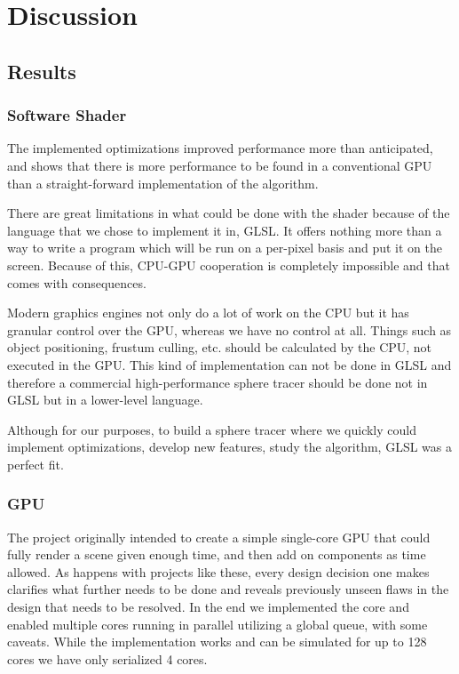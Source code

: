 \chapter{Discussion}
	
	\section{Results}
		
		\subsection{Software Shader}
		
			The implemented optimizations improved performance more than anticipated,
			and shows that there is more performance to be found in a conventional
			GPU than a straight-forward implementation of the algorithm. 

			There are great limitations in what could be done with the shader because
			of the language that we chose to implement it in, GLSL. It offers nothing 
			more than a way to write a program which will be run on a per-pixel basis
			and put it on the screen. Because of this, CPU-GPU cooperation is completely
			impossible and that comes with consequences.

			Modern graphics engines not only do a lot of work on the
			CPU but it has granular control over the GPU, whereas we have no control
			at all. Things such as object positioning, frustum culling, etc. should be 
			calculated by the CPU, not executed in the GPU. This kind of implementation can 
			not be done in GLSL and therefore a commercial high-performance sphere tracer should be done not in 
			GLSL but in a lower-level language.

			Although for our purposes, to build a sphere tracer where we quickly could implement
			optimizations, develop new features, study the algorithm, GLSL was a
			perfect fit. 
		
		\subsection{GPU} 
		
			The project originally intended to create a simple single-core GPU
			that could fully render a scene given enough time, and then add on
			components as time allowed. As happens with projects like these,
			every design decision one makes clarifies what further needs to be
			done and reveals previously unseen flaws in the design that needs
			to be resolved. In the end we implemented the core and enabled
			multiple cores running in parallel utilizing a global queue, with
			some caveats. While the implementation works and can be simulated
			for up to 128 cores we have only serialized 4 cores. 
			

